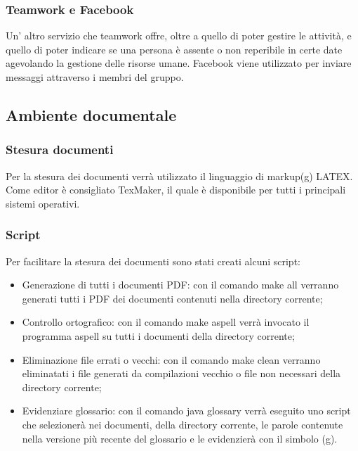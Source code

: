 \subsubsection{Teamwork e Facebook}

Un' altro servizio che teamwork offre, oltre a quello di poter gestire le attività, e quello di poter indicare se una persona è assente o non reperibile in certe date agevolando la gestione delle risorse umane.
Facebook viene utilizzato per inviare messaggi attraverso i membri del gruppo.

\subsection{Ambiente documentale}

\subsubsection{Stesura documenti}

Per la stesura dei documenti verrà utilizzato il linguaggio di markup(g) LATEX.
Come editor è consigliato TexMaker, il quale è disponibile per tutti i principali sistemi operativi.

\subsubsection{Script}

Per facilitare la stesura dei documenti sono stati creati alcuni script:

\begin{itemize}
	\item Generazione di tutti i documenti PDF: con il comando make all verranno generati tutti i PDF dei documenti contenuti nella directory corrente;
	\item Controllo ortografico: con il comando make aspell verrà invocato il programma aspell su tutti i documenti della directory corrente;
	\item Eliminazione file errati o vecchi: con il comando make clean verranno eliminatati i file generati da compilazioni vecchio o file non necessari della directory corrente;
	\item Evidenziare glossario: con il comando java glossary verrà eseguito uno script che selezionerà nei documenti, della directory corrente, le parole contenute nella versione più recente del glossario e le evidenzierà con il simbolo (g).

\end{itemize}

